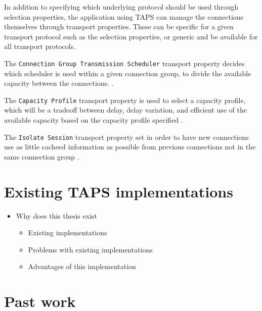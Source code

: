 In addition to specifying which underlying protocol should be
used through selection properties, the application  using TAPS can manage the connections
themselves through transport properties. These can be specific
for a given transport protocol such as the selection properties,
or generic and be available for all transport protocols.

The \texttt{Connection Group Transmission Scheduler} transport
property decides which scheduler is used within a given
connection group, to divide the available capacity between the
connections. \cite{paulyArchitectureRequirementsTransport2025}.

The \texttt{Capacity Profile} transport property is used to
select a capacity profile, which will be a tradeoff between
delay, delay variation, and efficient use of the available
capacity based on the capacity profile specified
\cite{paulyArchitectureRequirementsTransport2025}.

The \texttt{Isolate Session} transport property set in order to
have new connections use as little cacheed information as
possible from previous connections not in the same connection
group \cite{paulyArchitectureRequirementsTransport2025}.

\section{Existing TAPS implementations}

\begin{itemize}
	\item Why does this thesis exist
	      \begin{itemize}
		      \item Existing implementations
		      \item Problems with existing implementations
		      \item Advantages of this implementation
	      \end{itemize}
\end{itemize}

\section{Past work}


